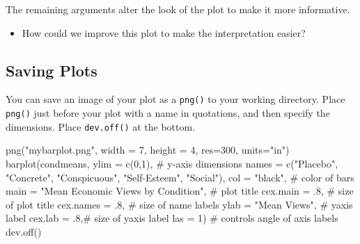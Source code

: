 \documentclass[
  letterpaper,
  DIV=11,
  numbers=noendperiod]{scrreprt}
\newenvironment{Shaded}{\begin{snugshade}}{\end{snugshade}}
\newcommand{\AttributeTok}[1]{\textcolor[rgb]{0.40,0.45,0.13}{#1}}
\newcommand{\CommentTok}[1]{\textcolor[rgb]{0.37,0.37,0.37}{#1}}
\newcommand{\DecValTok}[1]{\textcolor[rgb]{0.68,0.00,0.00}{#1}}
\newcommand{\FunctionTok}[1]{\textcolor[rgb]{0.28,0.35,0.67}{#1}}
\newcommand{\NormalTok}[1]{\textcolor[rgb]{0.00,0.23,0.31}{#1}}
\newcommand{\StringTok}[1]{\textcolor[rgb]{0.13,0.47,0.30}{#1}}
\providecommand{\tightlist}{%
  \setlength{\itemsep}{0pt}\setlength{\parskip}{0pt}}\usepackage{longtable,booktabs,array}
\begin{document}
The remaining arguments alter the look of the plot to make it more
informative.

\begin{itemize}
\tightlist
\item
  How could we improve this plot to make the interpretation easier?
\end{itemize}

\hypertarget{saving-plots}{%
\subsection{Saving Plots}\label{saving-plots}}

You can save an image of your plot as a \texttt{png()} to your working
directory. Place \texttt{png()} just before your plot with a name in
quotations, and then specify the dimensions. Place \texttt{dev.off()} at
the bottom.

\begin{Shaded}
\begin{Highlighting}[]
\FunctionTok{png}\NormalTok{(}\StringTok{"mybarplot.png"}\NormalTok{, }\AttributeTok{width =} \DecValTok{7}\NormalTok{, }\AttributeTok{height =} \DecValTok{4}\NormalTok{, }\AttributeTok{res=}\DecValTok{300}\NormalTok{, }\AttributeTok{units=}\StringTok{"in"}\NormalTok{)}
\FunctionTok{barplot}\NormalTok{(condmeans,}
        \AttributeTok{ylim =}  \FunctionTok{c}\NormalTok{(}\DecValTok{0}\NormalTok{,}\DecValTok{1}\NormalTok{), }\CommentTok{\# y{-}axis dimensions}
        \AttributeTok{names =} \FunctionTok{c}\NormalTok{(}\StringTok{"Placebo"}\NormalTok{, }\StringTok{"Concrete"}\NormalTok{, }\StringTok{"Conspicuous"}\NormalTok{, }
                  \StringTok{"Self{-}Esteem"}\NormalTok{, }\StringTok{"Social"}\NormalTok{),}
        \AttributeTok{col =} \StringTok{"black"}\NormalTok{, }\CommentTok{\# color of bars}
        \AttributeTok{main =} \StringTok{"Mean Economic Views by Condition"}\NormalTok{, }\CommentTok{\# plot title}
        \AttributeTok{cex.main =}\NormalTok{ .}\DecValTok{8}\NormalTok{, }\CommentTok{\# size of plot title}
        \AttributeTok{cex.names =}\NormalTok{ .}\DecValTok{8}\NormalTok{, }\CommentTok{\# size of name labels}
        \AttributeTok{ylab =} \StringTok{"Mean Views"}\NormalTok{, }\CommentTok{\# yaxis label}
        \AttributeTok{cex.lab =}\NormalTok{ .}\DecValTok{8}\NormalTok{,}\CommentTok{\# size of yaxis label}
        \AttributeTok{las =} \DecValTok{1}\NormalTok{) }\CommentTok{\# controls angle of axis labels}
\FunctionTok{dev.off}\NormalTok{()}
\end{Highlighting}
\end{Shaded}
\end{document}
